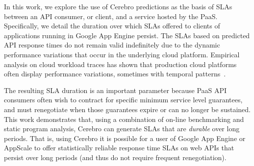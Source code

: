 In this work, we
explore the use of Cerebro predictions as the basis of SLAs between an API
consumer, or client,
and a service hosted by the PaaS.  Specifically, we detail the duration
over which SLAs offered to clients of applications running in Google App
Engine persist. The SLAs based on predicted API response times do not remain 
valid indefinitely due to the
dynamic performance variations that occur in the underlying cloud platform.
Empirical analysis on cloud workload traces has shown that production cloud
platforms often display performance variations, sometimes with temporal
patterns~\cite{5948601}.

The resulting SLA duration is an important parameter because PaaS API consumers
often
wish to contract for specific minimum service level guarantees, and must
renegotiate when those guarantees expire or can no longer be sustained.  
This work demonstrates that, using a combination of on-line benchmarking
and static program analysis, Cerebro can generate SLAs that are
\textit{durable} over long periods.  That is, using Cerebro it is possible for
a user of Google App Engine or AppScale to offer statistically
reliable response time SLAs on web APIs
that persist over long periods (and thus do not require frequent
renegotiation).


